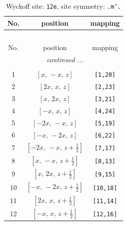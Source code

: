 \documentclass[fleqn,8pt]{jsarticle}
\begin{document}
\begin{longtable}{ccc}
\caption{Wyckoff site: {\tt 12e}, site symmetry: {\tt .m'.}}
 \\
 \hline \hline
No. & position & mapping \\ \hline \endfirsthead

\multicolumn{2}{l}{\tablename\ \thetable{}} \\
 \hline \hline
No. & position & mapping \\ \hline \endhead

 \hline \hline
\multicolumn{2}{r}{\footnotesize\it continued ...} \\ \endfoot

 \hline \hline
\multicolumn{2}{r}{} \\ \endlastfoot

1 & $\left[ x,\, - x,\, z \right]$ & {\tt [1,20]} \\ \hline
2 & $\left[ 2 x,\, x,\, z \right]$ & {\tt [2,23]} \\ \hline
3 & $\left[ x,\, 2 x,\, z \right]$ & {\tt [3,21]} \\ \hline
4 & $\left[ - x,\, x,\, z \right]$ & {\tt [4,24]} \\ \hline
5 & $\left[ - 2 x,\, - x,\, z \right]$ & {\tt [5,19]} \\ \hline
6 & $\left[ - x,\, - 2 x,\, z \right]$ & {\tt [6,22]} \\ \hline
7 & $\left[ - 2 x,\, - x,\, z + \frac{1}{2} \right]$ & {\tt [7,17]} \\ \hline
8 & $\left[ x,\, - x,\, z + \frac{1}{2} \right]$ & {\tt [8,13]} \\ \hline
9 & $\left[ x,\, 2 x,\, z + \frac{1}{2} \right]$ & {\tt [9,15]} \\ \hline
10 & $\left[ - x,\, - 2 x,\, z + \frac{1}{2} \right]$ & {\tt [10,18]} \\ \hline
11 & $\left[ 2 x,\, x,\, z + \frac{1}{2} \right]$ & {\tt [11,14]} \\ \hline
12 & $\left[ - x,\, x,\, z + \frac{1}{2} \right]$ & {\tt [12,16]} \\
\end{longtable}
\renewcommand{\arraystretch}{1.2}
\end{document}
